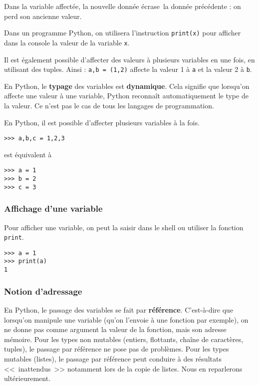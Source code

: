 Dans la variable affectée, la nouvelle donnée \og écrase\fg\ la donnée précédente : on perd son 
ancienne valeur.

Dans un programme Python, on utilisera l'instruction \texttt{print(x)}
pour afficher dans la console la valeur de la variable \texttt{x}.

Il est également possible d'affecter des valeurs à plusieurs variables en une fois, en utilisant 
des tuples. Ainsi : \texttt{a,b = (1,2)} affecte la valeur 1 à \texttt{a} et la valeur 2 à 
\texttt{b}.


\begin{remarque}
En Python, le \textbf{typage} des variables est \textbf{dynamique}. Cela signifie que lorsqu'on affecte une valeur à une variable, Python reconnaît automatiquement le type de la valeur. Ce n'est pas le cas de tous les langages de programmation.
\end{remarque}


\begin{remarque}
En Python, il est possible d'affecter plusieurs variables à la fois.

\begin{lstlisting}
>>> a,b,c = 1,2,3
\end{lstlisting}

est équivalent à 


\begin{lstlisting}
>>> a = 1
>>> b = 2
>>> c = 3
\end{lstlisting}
\end{remarque}

\subsubsection*{Affichage d'une variable}
Pour afficher une variable, on peut la saisir dans le shell ou utiliser la fonction \lstinline{print}.
\begin{lstlisting}
>>> a = 1
>>> print(a)
1
\end{lstlisting}


\subsubsection*{Notion d'adressage}

En Python, le passage des variables se fait par \textbf{référence}. C'est-à-dire que lorsqu'on manipule une variable (qu'on l'envoie à une fonction par exemple), on ne donne pas comme argument la valeur de la fonction, mais son adresse mémoire. Pour les types non mutables (entiers, flottants, chaîne de caractères, tuples), le passage par référence ne pose pas de problèmes. Pour les types mutables (listes), le passage par référence peut conduire à des résultats <<~inattendus~>> notamment lors de la copie de listes. Nous en reparlerons ultérieurement.

